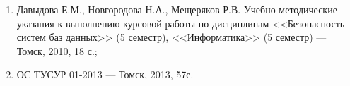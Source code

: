 \begin{enumerate}
  \item Давыдова Е.М., Новгородова Н.А., Мещеряков Р.В. Учебно-методические указания к выполнению курсовой работы по дисциплинам <<Безопасность систем баз данных>> (5 семестр), <<Информатика>> (5 семестр) --- Томск, 2010, 18 с.;
  \item ОС ТУСУР 01-2013 --- Томск, 2013, 57с.
\end{enumerate}
